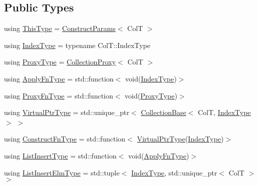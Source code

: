 \subsection*{Public Types}
\begin{DoxyCompactItemize}
\item 
using \hyperlink{structvt_1_1vrt_1_1collection_1_1param_1_1_construct_params_a13d4910c0f6825c7b0ddfebce5288bea}{This\+Type} = \hyperlink{structvt_1_1vrt_1_1collection_1_1param_1_1_construct_params}{Construct\+Params}$<$ ColT $>$
\item 
using \hyperlink{structvt_1_1vrt_1_1collection_1_1param_1_1_construct_params_a7bc8d5d57e377e0f2e60031582eeb7e6}{Index\+Type} = typename Col\+T\+::\+Index\+Type
\item 
using \hyperlink{structvt_1_1vrt_1_1collection_1_1param_1_1_construct_params_a837fb2b2a036f898fb65da72d3ee2fb0}{Proxy\+Type} = \hyperlink{structvt_1_1vrt_1_1collection_1_1_collection_proxy}{Collection\+Proxy}$<$ ColT $>$
\item 
using \hyperlink{structvt_1_1vrt_1_1collection_1_1param_1_1_construct_params_a4275ecc44239ac1aeedea9d31e93c78f}{Apply\+Fn\+Type} = std\+::function$<$ void(\hyperlink{structvt_1_1vrt_1_1collection_1_1param_1_1_construct_params_a7bc8d5d57e377e0f2e60031582eeb7e6}{Index\+Type})$>$
\item 
using \hyperlink{structvt_1_1vrt_1_1collection_1_1param_1_1_construct_params_ae1b51eac652fafee85f4c370e2c3b585}{Proxy\+Fn\+Type} = std\+::function$<$ void(\hyperlink{structvt_1_1vrt_1_1collection_1_1param_1_1_construct_params_a837fb2b2a036f898fb65da72d3ee2fb0}{Proxy\+Type})$>$
\item 
using \hyperlink{structvt_1_1vrt_1_1collection_1_1param_1_1_construct_params_a51c2b552a29b508b728b2e903d6073b1}{Virtual\+Ptr\+Type} = std\+::unique\+\_\+ptr$<$ \hyperlink{structvt_1_1vrt_1_1collection_1_1_collection_base}{Collection\+Base}$<$ ColT, \hyperlink{structvt_1_1vrt_1_1collection_1_1param_1_1_construct_params_a7bc8d5d57e377e0f2e60031582eeb7e6}{Index\+Type} $>$ $>$
\item 
using \hyperlink{structvt_1_1vrt_1_1collection_1_1param_1_1_construct_params_a7ad7bdf4220701e54b485f45e08b1736}{Construct\+Fn\+Type} = std\+::function$<$ \hyperlink{structvt_1_1vrt_1_1collection_1_1param_1_1_construct_params_a51c2b552a29b508b728b2e903d6073b1}{Virtual\+Ptr\+Type}(\hyperlink{structvt_1_1vrt_1_1collection_1_1param_1_1_construct_params_a7bc8d5d57e377e0f2e60031582eeb7e6}{Index\+Type})$>$
\item 
using \hyperlink{structvt_1_1vrt_1_1collection_1_1param_1_1_construct_params_aabef3a4ec2a70d29d2b5161daf66e153}{List\+Insert\+Type} = std\+::function$<$ void(\hyperlink{structvt_1_1vrt_1_1collection_1_1param_1_1_construct_params_a4275ecc44239ac1aeedea9d31e93c78f}{Apply\+Fn\+Type})$>$
\item 
using \hyperlink{structvt_1_1vrt_1_1collection_1_1param_1_1_construct_params_ac04e58216ca54c39b91f15f6bb46afc9}{List\+Insert\+Elm\+Type} = std\+::tuple$<$ \hyperlink{structvt_1_1vrt_1_1collection_1_1param_1_1_construct_params_a7bc8d5d57e377e0f2e60031582eeb7e6}{Index\+Type}, std\+::unique\+\_\+ptr$<$ ColT $>$ $>$
\end{DoxyCompactItemize}
